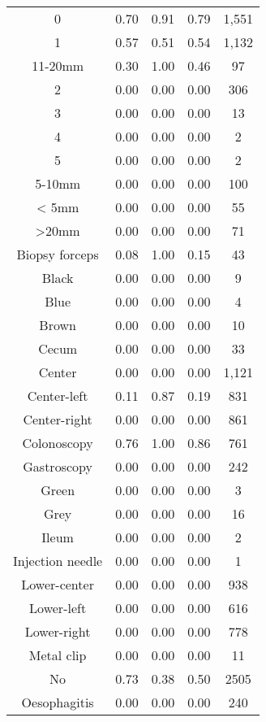 \begin{center}
\begin{longtable}{|c|c|c|c|c|}
0  &   0.70  &  0.91  &  0.79  &  1,551 \\
1  &   0.57  &  0.51  &  0.54  &  1,132 \\
11-20mm  &   0.30  &  1.00  &  0.46  &    97 \\
2  &   0.00  &  0.00  &  0.00  &   306 \\
3  &   0.00  &  0.00  &  0.00  &    13 \\
4  &   0.00  &  0.00  &  0.00   &  2 \\
5  &   0.00  &  0.00  &  0.00   &  2 \\
5-10mm  &   0.00  &  0.00  &  0.00  &   100 \\
< 5mm  &   0.00  &  0.00  &  0.00  &    55 \\
>20mm  &   0.00  &  0.00  &  0.00  &    71 \\
Biopsy forceps  &   0.08  &  1.00  &  0.15  &    43 \\
Black  &   0.00  &  0.00  &  0.00   &  9 \\
Blue  &   0.00  &  0.00  &  0.00   &  4 \\
Brown  &   0.00  &  0.00  &  0.00  &    10 \\
Cecum  &   0.00  &  0.00  &  0.00  &    33 \\
Center  &   0.00  &  0.00  &  0.00  &  1,121 \\
Center-left  &   0.11  &  0.87  &  0.19  &   831 \\
Center-right  &   0.00  &  0.00  &  0.00  &   861 \\
Colonoscopy  &   0.76  &  1.00  &  0.86  &   761 \\
Gastroscopy  &   0.00  &  0.00  &  0.00  &   242 \\
Green  &   0.00  &  0.00  &  0.00   &  3 \\
Grey  &   0.00  &  0.00  &  0.00  &    16 \\
Ileum  &   0.00  &  0.00  &  0.00   &  2 \\
Injection needle  &   0.00  &  0.00  &  0.00   &  1 \\
Lower-center  &   0.00  &  0.00  &  0.00  &   938 \\
Lower-left  &   0.00  &  0.00  &  0.00  &   616 \\
Lower-right  &   0.00  &  0.00  &  0.00  &   778 \\
Metal clip  &   0.00  &  0.00  &  0.00  &    11 \\
No  &   0.73  &  0.38  &  0.50  &  2505 \\
Oesophagitis  &   0.00  &  0.00  &  0.00  &   240 \\

\end{longtable}
\end{center}
